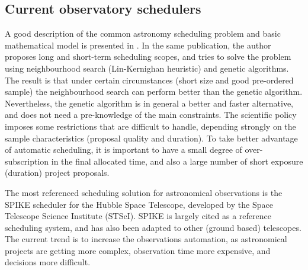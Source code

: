 \documentclass[11pt]{article}
\begin{document}
\subsection{Current observatory schedulers}

A good description of the common astronomy scheduling problem and basic mathematical model is presented in \cite{gomez03}. In the same publication, the author proposes long and short-term scheduling scopes, and tries to solve the problem using neighbourhood search (Lin-Kernighan heuristic) and genetic algorithms. The result is that under certain circumstances (short size and good pre-ordered sample) the neighbourhood search can perform better than the genetic algorithm. Nevertheless, the genetic algorithm is in general a better and faster alternative, and does not need a pre-knowledge of the main constraints. The scientific policy imposes some restrictions that are difficult to handle, depending strongly on the sample characteristics (proposal quality and duration). To take better advantage of automatic scheduling, it is important to have a small degree of over-subscription in the final allocated time, and also a large number of short exposure (duration) project proposals.

The most referenced scheduling solution for astronomical observations is the SPIKE scheduler for the Hubble Space Telescope, developed by the Space Telescope Science Institute (STScI). SPIKE is largely cited as a reference scheduling system, and has also been adapted to other (ground based) telescopes. The current trend is to increase the observations automation, as astronomical projects are getting more complex, observation time more expensive, and decisions more difficult.
\end{document}
